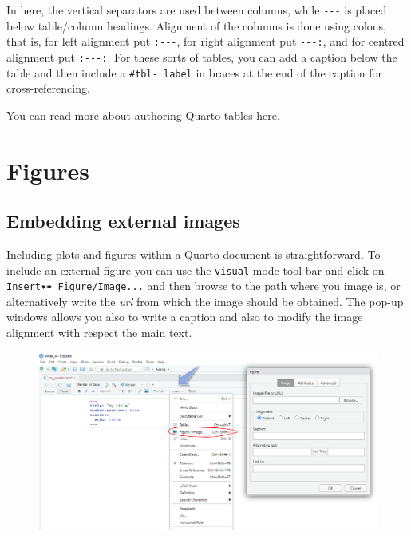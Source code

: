 \documentclass[
  letterpaper,
  DIV=11,
  numbers=noendperiod]{scrartcl}
\begin{document}
In here, the vertical separators \texttt{\textbar{}} are used between
columns, while \texttt{-\/-\/-} is placed below table/column headings.
Alignment of the columns is done using colons, that is, for left
alignment put \texttt{:-\/-\/-}, for right alignment put
\texttt{-\/-\/-:}, and for centred alignment put \texttt{:-\/-\/-:}. For
these sorts of tables, you can add a caption below the table and then
include a \texttt{\#tbl-\ label} in braces at the end of the caption for
cross-referencing.

\begin{tcolorbox}[enhanced jigsaw, colback=white, toprule=.15mm, arc=.35mm, colbacktitle=quarto-callout-note-color!10!white, titlerule=0mm, colframe=quarto-callout-note-color-frame, title=\textcolor{quarto-callout-note-color}{\faInfo}\hspace{0.5em}{Note}, bottomtitle=1mm, toptitle=1mm, coltitle=black, rightrule=.15mm, opacityback=0, bottomrule=.15mm, breakable, leftrule=.75mm, left=2mm, opacitybacktitle=0.6]

You can read more about authoring Quarto tables
\href{https://quarto.org/docs/authoring/tables.html}{here}.

\end{tcolorbox}

\hypertarget{figures}{%
\section{Figures}\label{figures}}

\hypertarget{embedding-external-images}{%
\subsection{Embedding external images}\label{embedding-external-images}}

Including plots and figures within a Quarto document is straightforward.
To include an external figure you can use the \texttt{visual} mode tool
bar and click on \texttt{Insert▾➠\ Figure/Image...} and then browse to
the path where you image is, or alternatively write the \emph{url} from
which the image should be obtained. The pop-up windows allows you also
to write a caption and also to modify the image alignment with respect
the main text.

\begin{figure}

{\centering \includegraphics{images/quarto8.png}

}

\end{figure}
\end{document}
